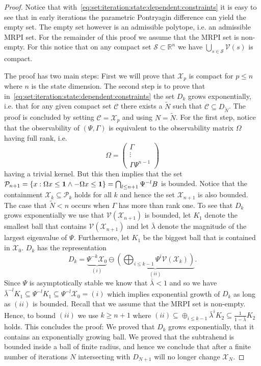 \documentclass[letterpaper, 10pt, conference]{ieeeconf} %
\begin{document}
\begin{proof}
Notice that with~\eqref{eq:set:iteration:state:dependent:constraints} it is easy to see that in early
iterations the parametric Pontryagin difference can yield the empty set. The empty set however is
an admissible polytope, i.e. an admissible MRPI set. For the remainder of this proof we assume
that the MRPI set is non-empty. For this notice that on any compact set $\mathcal S\subset\mathbb R^n$ we
have $\bigcup_{s\in\mathcal S}\mathcal V(s)$ is compact.

The proof has two main steps: First we will prove that $\mathcal X_p$ is compact for $p\leq n$
where $n$ is the state dimension. The second step is to prove that in~\eqref{eq:set:iteration:state:dependent:constraints}
the set $D_k$ grows exponentially, i.e. that for any given compact set $\mathcal C$ there exists
a $\tilde N$ such that $\mathcal C\subseteq D_{\tilde N}$. The proof is concluded by setting 
$\mathcal C = \mathcal X_p$ and using $N = \tilde N$. For the first step, notice that the observability of
$(\Psi,\Gamma)$ is equivalent to the observability matrix $\Omega$ having full rank, i.e.
\[
\Omega = \left(\begin{array}{c}
\Gamma\\ \vdots \\ \Gamma\Psi^{n-1}
\end{array}\right)
\]
having a trivial kernel. But this then implies that the set $\mathcal P_{n+1} = \{x: 
\Omega x\leq{\bf{1}}\wedge-\Omega x\leq{\bf{1}}\} = \bigcap_{l\leq n+1} \Psi^{-l} B$ is bounded.
Notice that the containment $\mathcal X_k\subseteq \mathcal P_k$ holds for all $k$ and hence
the set $\mathcal X_{n+1}$ is also bounded. The case that $\tilde N<n$ occurs when $\Gamma$
has more than rank one. To see that $D_k$ grows exponentially we use that $\mathcal V(\mathcal X_{n+1})$
is bounded, let $K_1$ denote the smallest ball that contains $\mathcal V(\mathcal X_{n+1})$ and let
$\bar\lambda$ denote the magnitude of the largest eigenvalue of $\Psi$. Furthermore, let $K_1$
be the biggest ball that is contained in $\mathcal X_{0}$. $D_k$ has the representation
\begin{equation}
D_k = \underbrace{\Psi^{-k}\mathcal X_0}_{(i)} \ominus \underbrace{\left(\bigoplus_{i\leq k-1} 
\Psi^i\mathcal V(\mathcal X_k)\right)}_{(ii)}.
\end{equation}
Since $\Psi$ is asymptotically stable we know that $\bar\lambda<1$ and so we have 
$\bar\lambda^{-l}K_1\subseteq\Psi^{-l} K_1 \subseteq \Psi^{-l}\mathcal X_0 = (i)$
which implies exponential growth of $D_k$ as long as $(ii)$ is bounded. Recall that we assume
that the MRPI set is non-empty.
Hence, to bound $(ii)$ we use $k\geq n+1$ where $(ii)\subseteq \oplus_{i\leq k-1} \bar\lambda^i K_2 \subseteq
\frac{1}{1-\bar\lambda} K_2$ holds. This concludes the proof: We proved that $D_k$ grows exponentially,
that it contains an exponentially growing ball. We proved that the subtrahend is bounded inside a ball of
finite radius, and hence we conclude that after a finite number of iterations $N$ intersecting with $D_{N+1}$
will no longer change $\mathcal X_N$.
\end{proof}
\end{document}
